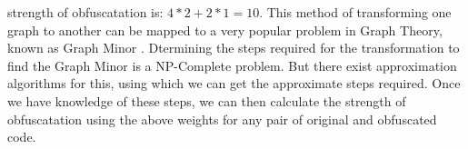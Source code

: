 \documentclass[conference]{IEEEtran}
\begin{document}
strength of obfuscatation is: $4 * 2 + 2 * 1 = 10$.
This method of transforming one graph to another can be mapped to a very popular problem in Graph Theory, known as Graph Minor \cite{graphminor}. Dtermining the steps required for the 
transformation to find the Graph Minor is a NP-Complete problem. But there exist approximation algorithms \cite{Demaine05} for this, using which we can get the approximate steps required. 
Once we have knowledge of these steps, we can then calculate the strength of obfuscatation using the above weights for any pair of original and obfuscated code.
\end{document}
